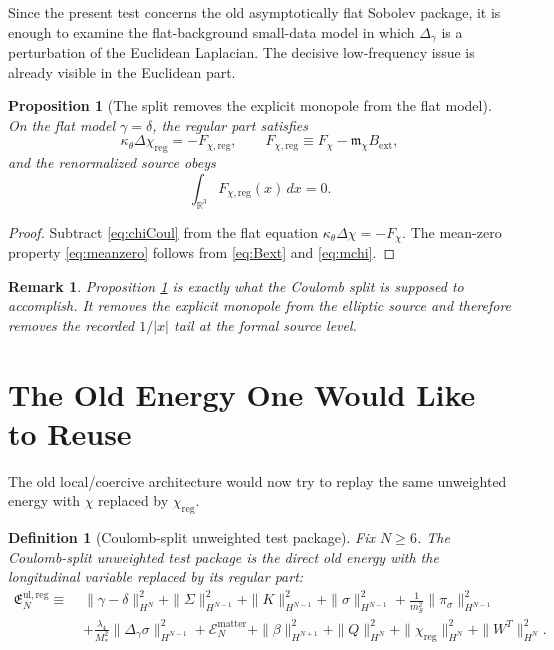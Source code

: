\documentclass[11pt]{article}
\newtheorem{definition}{Definition}
\newtheorem{proposition}{Proposition}
\newtheorem{remark}{Remark}
\begin{document}
Since the present test concerns the old asymptotically flat Sobolev package, it is enough to examine the flat-background small-data model in which \(\Delta_\gamma\) is a perturbation of the Euclidean Laplacian. The decisive low-frequency issue is already visible in the Euclidean part.

\begin{proposition}[The split removes the explicit monopole from the flat model]
\label{prop:meanzero}
On the flat model \(\gamma=\delta\), the regular part satisfies
\begin{equation}
\kappa_\theta \Delta \chi_{\mathrm{reg}}
=
-F_{\chi,\mathrm{reg}},
\qquad
F_{\chi,\mathrm{reg}}
\equiv
F_\chi-\mathfrak m_\chi B_{\mathrm{ext}},
\label{eq:chireg}
\end{equation}
and the renormalized source obeys
\begin{equation}
\int_{\mathbb R^3} F_{\chi,\mathrm{reg}}(x)\,dx = 0.
\label{eq:meanzero}
\end{equation}
\end{proposition}

\begin{proof}
Subtract \eqref{eq:chiCoul} from the flat equation \(\kappa_\theta\Delta\chi=-F_\chi\). The mean-zero property \eqref{eq:meanzero} follows from \eqref{eq:Bext} and \eqref{eq:mchi}.
\end{proof}

\begin{remark}
Proposition \ref{prop:meanzero} is exactly what the Coulomb split is supposed to accomplish. It removes the explicit monopole from the elliptic source and therefore removes the \emph{recorded} \(1/|x|\) tail at the formal source level.
\end{remark}

\section{The Old Energy One Would Like to Reuse}

The old local/coercive architecture would now try to replay the same unweighted energy with \(\chi\) replaced by \(\chi_{\mathrm{reg}}\).

\begin{definition}[Coulomb-split unweighted test package]
Fix \(N\ge 6\). The \emph{Coulomb-split unweighted test package} is the direct old energy with the longitudinal variable replaced by its regular part:
\begin{align}
\mathfrak E_N^{\mathrm{ul,reg}}
\equiv\;&
\|\gamma-\delta\|_{H^N}^2
+ \|\Sigma\|_{H^{N-1}}^2
+ \|K\|_{H^{N-1}}^2
+ \|\sigma\|_{H^{N-1}}^2
+ \frac{1}{m_S^2}\|\pi_\sigma\|_{H^{N-1}}^2
\nonumber\\
&+
\frac{\lambda_4}{M_*^2}\|\Delta_\gamma \sigma\|_{H^{N-1}}^2
+ \mathcal E_N^{\mathrm{matter}}
+ \|\beta\|_{H^{N+1}}^2
+ \|Q\|_{H^N}^2
+ \|\chi_{\mathrm{reg}}\|_{H^N}^2
+ \|W^T\|_{H^N}^2.
\label{eq:Ereg}
\end{align}
\end{definition}
\end{document}
